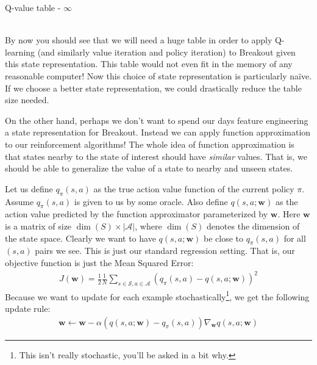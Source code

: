 \documentclass[11pt,addpoints,answers]{exam}
\newcommand{\wv}{\mathbf{w}}
\begin{document}
\begin{questions}
\begin{parts}
\begin{your_solution}[title=Answer,height=2cm,width=15cm]
        Q-value table - $\infty$
    \end{your_solution}\\
    
    
    By now you should see that we will need a huge table in order to apply Q-learning (and similarly value iteration and policy iteration) to Breakout given this state representation. This table would not even fit in the memory of any reasonable computer! Now this choice of state representation is particularly na\"ive. If we choose a better state representation, we could drastically reduce the table size needed. 
    
    On the other hand, perhaps we don't want to spend our days feature engineering a state representation for Breakout. Instead we can apply function approximation to our reinforcement algorithms! The whole idea of function approximation is that states nearby to the state of interest should have \emph{similar} values. That is, we should be able to generalize the value of a state to nearby and unseen states.
    
    Let us define $q_\pi(s, a)$ as the true action value function of the current policy $\pi$. Assume $q_\pi(s,a)$ is given to us by some oracle. Also define $q(s, a; \wv)$ as the action value predicted by the function approximator parameterized by $\wv$. Here $\wv$ is a matrix of size $\dim(S) \times |\mathcal{A}|$, where $\dim(S)$ denotes the dimension of the state space. Clearly we want to have $q(s, a; \wv)$ be close to $q_\pi(s, a)$ for all $(s, a)$ pairs we see. This is just our standard regression setting. That is, our objective function is just the Mean Squared Error:
    \begin{align}
    J(\wv) = \frac{1}{2} \frac{1}{N} \sum_{s\in\mathcal{S}, a\in\mathcal{A}} \left(q_\pi(s, a) - q(s, a; \wv) \right)^2
    \end{align}
    Because we want to update for each example stochastically\footnote{This isn't really stochastic, you'll be asked in a bit why.}, we get the following update rule:
    \begin{align}
    \wv \leftarrow \wv - \alpha \left(q(s, a; \wv) - q_\pi(s,a) \right) \nabla_\wv q(s, a; \wv)
    \end{align}
    

\end{parts}
\end{questions}
\end{document}

